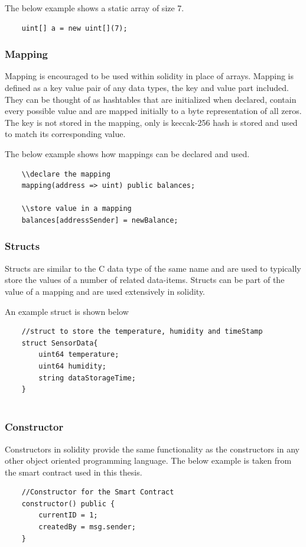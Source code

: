 \documentclass[11pt,openright]{report}
\begin{document}
The below example shows a static array of size 7.
\begin{verbatim}
    uint[] a = new uint[](7);
\end{verbatim}

\subsubsection{Mapping}
Mapping is encouraged to be used within solidity in place of arrays. Mapping is defined as a key value pair of any data types, the key and value part included. They can be thought of as hashtables that are initialized when declared, contain every possible value and are mapped initially to a byte representation of all zeros. The key is not stored in the mapping, only is keccak-256 hash is stored and used to match its corresponding value.

The below example shows how mappings can be declared and used.
\begin{verbatim}
    \\declare the mapping
    mapping(address => uint) public balances;
    
    \\store value in a mapping
    balances[addressSender] = newBalance;
\end{verbatim}

\subsubsection{Structs}
Structs are similar to the C data type of the same name and are used to typically store the values of a number of related data-items. Structs can be part of the value of a mapping and are used extensively in solidity.

An example struct is shown below
\begin{verbatim}
    //struct to store the temperature, humidity and timeStamp
    struct SensorData{
        uint64 temperature;
        uint64 humidity;
        string dataStorageTime;
    }
    
\end{verbatim}

\subsubsection{Constructor}
Constructors in solidity provide the same functionality as the constructors in any other object oriented programming language. The below example is taken from the smart contract used in this thesis.
\begin{verbatim}
    //Constructor for the Smart Contract
    constructor() public {
        currentID = 1;
        createdBy = msg.sender;
    }
\end{verbatim}
\end{document}

